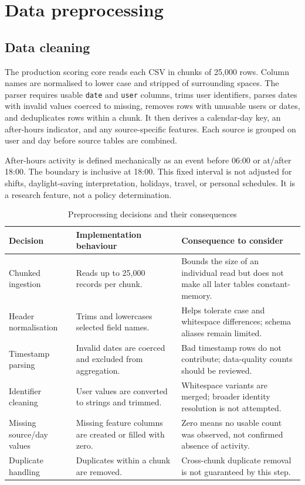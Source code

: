 \documentclass[12pt,a4paper,oneside]{report}
\newcommand{\tablefont}{\small}
\newcommand{\code}[1]{\texttt{\small #1}}
\begin{document}
\section{Data preprocessing}

\subsection{Data cleaning}
The production scoring core reads each CSV in chunks of 25,000 rows.
Column names are normalised to lower case and stripped of surrounding
spaces. The parser requires usable \code{date} and \code{user}
columns, trims user identifiers, parses dates with invalid values
coerced to missing, removes rows with unusable users or dates, and
deduplicates rows within a chunk. It then derives a calendar-day key,
an after-hours indicator, and any source-specific features. Each
source is grouped on user and day before source tables are combined.

After-hours activity is defined mechanically as an event before 06:00
or at/after 18:00. The boundary is inclusive at 18:00. This fixed
interval is not adjusted for shifts, daylight-saving interpretation,
holidays, travel, or personal schedules. It is a research feature, not
a policy determination.

\begin{table}[H]
\centering
\tablefont
\caption{Preprocessing decisions and their consequences}
\label{tab:preprocessing-decisions}
\begin{tabularx}{\textwidth}{|p{}|p{}|Y|}
\hline
\textbf{Decision} & \textbf{Implementation behaviour} & \textbf{Consequence to consider}\\\hline
Chunked ingestion & Reads up to 25,000 records per chunk. & Bounds the size of an individual read but does not make all later tables constant-memory.\\\hline
Header normalisation & Trims and lowercases selected field names. & Helps tolerate case and whitespace differences; schema aliases remain limited.\\\hline
Timestamp parsing & Invalid dates are coerced and excluded from aggregation. & Bad timestamp rows do not contribute; data-quality counts should be reviewed.\\\hline
Identifier cleaning & User values are converted to strings and trimmed. & Whitespace variants are merged; broader identity resolution is not attempted.\\\hline
Missing source/day values & Missing feature columns are created or filled with zero. & Zero means no usable count was observed, not confirmed absence of activity.\\\hline
Duplicate handling & Duplicates within a chunk are removed. & Cross-chunk duplicate removal is not guaranteed by this step.\\\hline
\end{tabularx}
\end{table}
\end{document}
